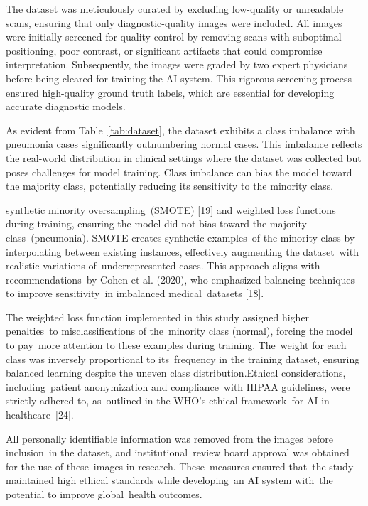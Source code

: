 \documentclass[
  twocolumn,
  10pt,
  a4paper,
  journal
]{IEEEtran}
\begin{document}
The dataset was meticulously curated by excluding low-quality or unreadable scans, ensuring that only diagnostic-quality images were included. All images were initially screened for quality control by removing scans with suboptimal positioning, poor contrast, or significant artifacts that could compromise interpretation. Subsequently, the images were graded by two expert physicians before being cleared for training the AI system. This rigorous screening process ensured high-quality ground truth labels, which are essential for developing accurate diagnostic models.

As evident from Table~\ref{tab:dataset}, the dataset exhibits a class imbalance with pneumonia cases significantly outnumbering normal cases. This imbalance reflects the real-world distribution in clinical settings where the dataset was collected but poses challenges for model training. Class imbalance can bias the model toward the majority class, potentially reducing its sensitivity to the minority class.

synthetic minority oversampling~(SMOTE) {[}19{]} and weighted loss functions during training, ensuring the model did not bias toward the majority class~(pneumonia). SMOTE creates synthetic examples~of the minority class by interpolating between existing instances, effectively augmenting the dataset~with realistic variations of~underrepresented cases. This approach aligns with recommendations~by Cohen et al. (2020), who emphasized balancing techniques to improve sensitivity~in imbalanced medical~datasets {[}18{]}.

The weighted loss function implemented in this study assigned higher penalties~to misclassifications of the~minority class (normal), forcing the model to pay~more attention to these examples during training. The~weight for each class was inversely proportional to its~frequency in the training dataset, ensuring balanced learning despite the uneven class distribution.Ethical considerations, including~patient anonymization and compliance~with HIPAA guidelines, were strictly adhered to, as~outlined in the WHO's ethical framework~for AI in healthcare~{[}24{]}.

All personally identifiable information was removed from the images before inclusion~in the dataset, and institutional~review board approval was obtained for the use of these~images in research. These~measures ensured that~the study maintained high ethical standards while developing~an AI system with~the potential to improve global~health outcomes.
\end{document}
